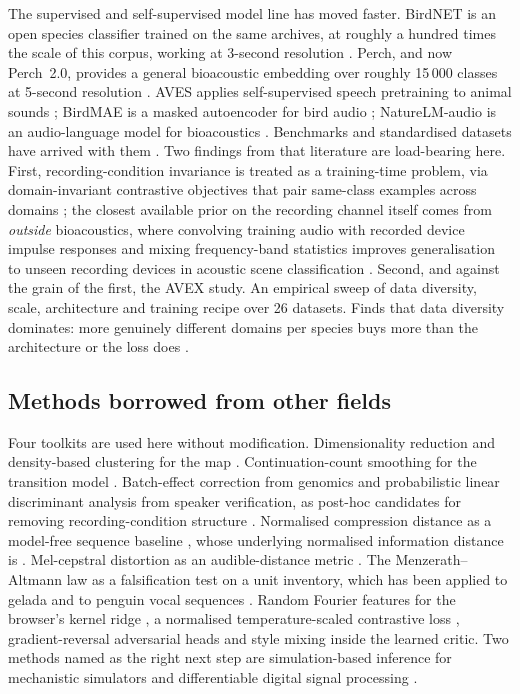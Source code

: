 \documentclass[10pt,twocolumn,a4paper]{article}
\begin{document}
The supervised and self-supervised model line has moved faster. BirdNET is an open
species classifier trained on the same archives, at roughly a hundred times the scale of
this corpus, working at 3-second resolution \citep{birdnet2021}. Perch, and now Perch~2.0,
provides a general bioacoustic embedding over roughly 15\,000 classes at 5-second
resolution \citep{perch2}. AVES applies self-supervised speech pretraining to animal
sounds \citep{aves2022}; BirdMAE is a masked autoencoder for bird
audio \citep{birdmae2025}; NatureLM-audio is an audio-language model for
bioacoustics \citep{naturelm2024}. Benchmarks and standardised datasets have arrived with
them \citep{beans2022,birdset2024}. Two findings from that literature are load-bearing
here. First, recording-condition invariance is treated as a training-time problem, via
domain-invariant contrastive objectives that pair same-class examples across
domains \citep{moummad2024}; the closest available prior on the recording channel itself comes
from \emph{outside} bioacoustics, where convolving training audio with recorded device impulse
responses and mixing frequency-band statistics improves generalisation to unseen recording
devices in acoustic scene classification \citep{morocutti2023}. Second, and against the grain
of the first, the AVEX study. An empirical sweep of data diversity, scale, architecture and
training recipe over 26 datasets. Finds that data diversity dominates: more genuinely
different domains per species buys more than the architecture or the loss
does \citep{avex2025}.

\subsection{Methods borrowed from other fields}

Four toolkits are used here without modification. Dimensionality reduction and
density-based clustering for the map \citep{umap2018,hdbscan2013}. Continuation-count
smoothing for the transition model \citep{kneser1995}. Batch-effect correction from
genomics and probabilistic linear discriminant analysis from speaker verification, as
post-hoc candidates for removing recording-condition
structure \citep{korsunsky2019,prince2007}. Normalised compression distance as a
model-free sequence baseline \citep{cilibrasi2005}, whose underlying normalised information
distance is \citet{li2004}. Mel-cepstral distortion as an audible-distance
metric \citep{kubichek1993}. The Menzerath--Altmann law as a falsification test on a unit
inventory, which has been applied to gelada and to penguin vocal
sequences \citep{gustison2016,favaro2020}. Random Fourier features for the browser's kernel
ridge \citep{rff2007}, a normalised temperature-scaled contrastive
loss \citep{simclr2020}, gradient-reversal adversarial heads \citep{ganin2016} and
style mixing \citep{zhou2021mixstyle} inside the learned critic. Two methods named as the
right next step are simulation-based inference for mechanistic
simulators \citep{cranmer2020} and differentiable digital signal
processing \citep{ddsp2020}.
\end{document}
